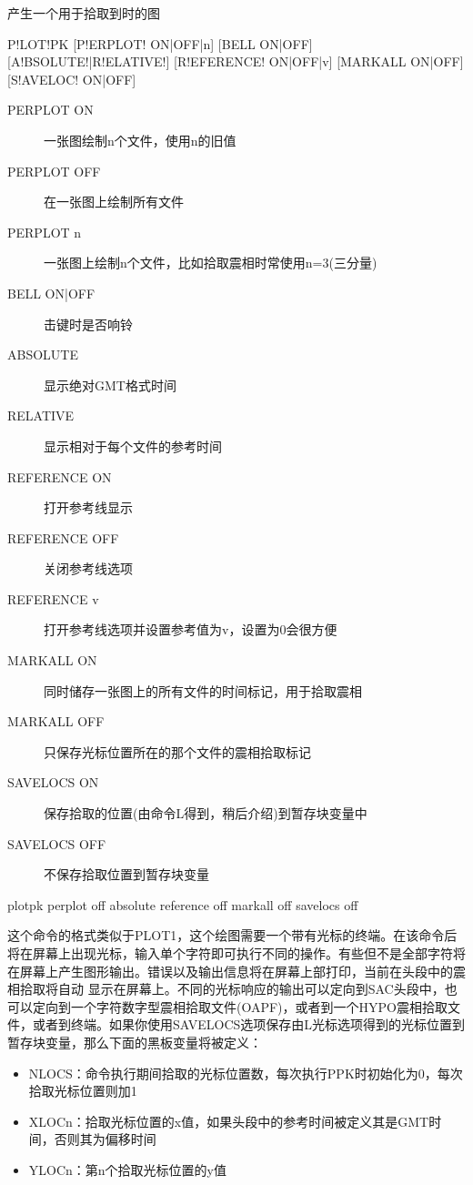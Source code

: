 \label{cmd:plotpk}

产生一个用于拾取到时的图

\begin{SACSTX}
P!LOT!PK [P!ERPLOT! ON|OFF|n] [BELL ON|OFF] [A!BSOLUTE!|R!ELATIVE!]
    [R!EFERENCE! ON|OFF|v] [MARKALL ON|OFF] [S!AVELOC! ON|OFF]
\end{SACSTX}

\begin{description}
\item [PERPLOT ON] 一张图绘制n个文件，使用n的旧值
\item [PERPLOT OFF] 在一张图上绘制所有文件
\item [PERPLOT n] 一张图上绘制n个文件，比如拾取震相时常使用n=3(三分量)
\item [BELL ON|OFF]  击键时是否响铃
\item [ABSOLUTE] 显示绝对GMT格式时间
\item [RELATIVE] 显示相对于每个文件的参考时间
\item [REFERENCE ON] 打开参考线显示
\item [REFERENCE OFF] 关闭参考线选项
\item [REFERENCE v] 打开参考线选项并设置参考值为v，设置为0会很方便
\item [MARKALL ON] 同时储存一张图上的所有文件的时间标记，用于拾取震相
\item [MARKALL OFF] 只保存光标位置所在的那个文件的震相拾取标记
\item [SAVELOCS ON]  保存拾取的位置(由命令L得到，稍后介绍)到暂存块变量中
\item [SAVELOCS OFF]  不保存拾取位置到暂存块变量
\end{description}

\begin{SACDFT}
plotpk perplot off absolute reference off markall off savelocs off
\end{SACDFT}

这个命令的格式类似于PLOT1，这个绘图需要一个带有光标的终端。在该命令后将在屏幕上出现光标，输入单个字符即可执行不同的操作。有些但不是全部字符将在屏幕上产生图形输出。错误以及输出信息将在屏幕上部打印，当前在头段中的震相拾取将自动	显示在屏幕上。不同的光标响应的输出可以定向到SAC头段中，也可以定向到一个字符数字型震相拾取文件(OAPF)，或者到一个HYPO震相拾取文件，或者到终端。如果你使用SAVELOCS选项保存由L光标选项得到的光标位置到暂存块变量，那么下面的黑板变量将被定义：
\begin{itemize}
\item NLOCS：命令执行期间拾取的光标位置数，每次执行PPK时初始化为0，每次拾取光标位置则加1
\item XLOCn：拾取光标位置的x值，如果头段中的参考时间被定义其是GMT时间，否则其为偏移时间
\item YLOCn：第n个拾取光标位置的y值
\end{itemize}
